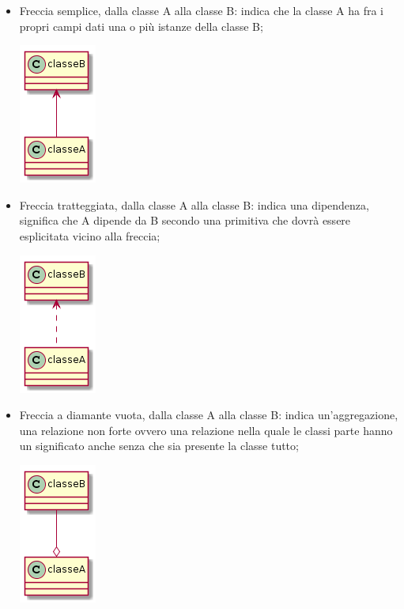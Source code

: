 	    \begin{itemize}
	        \item Freccia semplice, dalla classe A alla classe B: indica che la classe A ha fra i propri campi dati una o più istanze della classe B;\par
    	    \begin{minipage}{\linewidth}
        		\centering
        		\includegraphics{dipendenzaForteTraAeB.png}
        	\end{minipage}
        	\item Freccia tratteggiata, dalla classe A alla classe B: indica una dipendenza, significa che A dipende da B secondo una primitiva che dovrà essere esplicitata vicino alla freccia;\par
    	    \begin{minipage}{\linewidth}
        		\centering
        		\includegraphics{dipendenzaDeboleTraAeB.png}
        	\end{minipage}
        	\item Freccia a diamante vuota, dalla classe A alla classe B: indica un’aggregazione, una relazione non forte ovvero una relazione nella quale le classi parte hanno un significato anche senza che sia presente la classe tutto;\par
        	\begin{minipage}{\linewidth}
        		\centering
        		\includegraphics{aggregazioneTraAeB.png}

\end{minipage}
\end{itemize}
